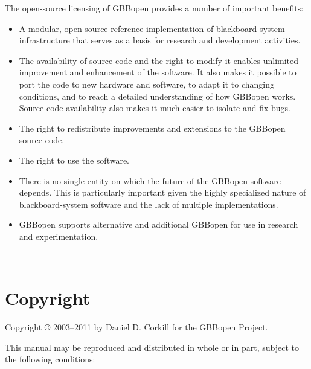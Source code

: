 \documentclass[10pt,twoside,english,pdftex]{article}
\begin{document}
{The open-source licensing of GBBopen provides a number of important benefits:
\begin{itemize}
\item A modular, open-source reference implementation of
  blackboard-system infrastructure that serves as a basis for research
  and development activities.
\item The availability of source code and the right to modify it
  enables unlimited improvement and enhancement of the software. It
  also makes it possible to port the code to new hardware and
  software, to adapt it to changing conditions, and to reach a
  detailed understanding of how GBBopen works. Source code
  availability also makes it much easier to isolate and fix bugs.
\item The right to redistribute improvements and extensions to the
  GBBopen source code.
\item The right to use the software.
\item There is no single entity on which the future of the GBBopen
  software depends. This is particularly important given the highly
  specialized nature of blackboard-system software and the lack of
  multiple implementations.
\item GBBopen supports alternative and additional GBBopen  for
  use in research and experimentation.
\end{itemize}
}%


\T\begin{ifhtml} 
  \intro
  \setcounter{htmlautomenu}{0}
\T\end{ifhtml}

\T\thispagestyle{empty}


\T\newpage
\T~
\T\vfill
\W{}
\W\section*{Copyright}

Copyright \copyright{} 2003--2011 by Daniel D. Corkill for the
GBBopen Project.

This manual may be reproduced and distributed in whole or in
part, subject to the following conditions: 
\end{document}
